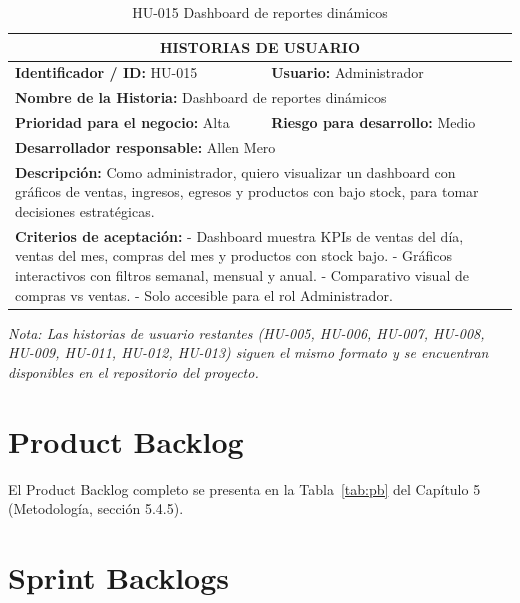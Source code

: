 \documentclass[12pt, letterpaper]{report}
\begin{document}
\begin{table}[H]
\centering
\caption{HU-015 Dashboard de reportes dinámicos}
\begin{tabularx}{\textwidth}{|X X|}
\hline
\multicolumn{2}{|c|}{\textbf{HISTORIAS DE USUARIO}} \\ \hline
\textbf{Identificador / ID:} HU-015 & \textbf{Usuario:} Administrador \\ \hline
\multicolumn{2}{|l|}{\textbf{Nombre de la Historia:} Dashboard de reportes dinámicos} \\ \hline
\textbf{Prioridad para el negocio:} Alta & \textbf{Riesgo para desarrollo:} Medio \\ \hline
\multicolumn{2}{|l|}{\textbf{Desarrollador responsable:} Allen Mero} \\ \hline
\multicolumn{2}{|p{0.95\textwidth}|}{\textbf{Descripción:} Como administrador, quiero visualizar un dashboard con gráficos de ventas, ingresos, egresos y productos con bajo stock, para tomar decisiones estratégicas.} \\ \hline
\multicolumn{2}{|p{0.95\textwidth}|}{\textbf{Criterios de aceptación:} \newline
- Dashboard muestra KPIs de ventas del día, ventas del mes, compras del mes y productos con stock bajo. \newline
- Gráficos interactivos con filtros semanal, mensual y anual. \newline
- Comparativo visual de compras vs ventas. \newline
- Solo accesible para el rol Administrador.} \\ \hline
\end{tabularx}
\end{table}

\textit{Nota: Las historias de usuario restantes (HU-005, HU-006, HU-007, HU-008, HU-009, HU-011, HU-012, HU-013) siguen el mismo formato y se encuentran disponibles en el repositorio del proyecto.}

\chapter{Product Backlog}

El Product Backlog completo se presenta en la Tabla~\ref{tab:pb} del Capítulo 5 (Metodología, sección 5.4.5).

\chapter{Sprint Backlogs}
\end{document}

